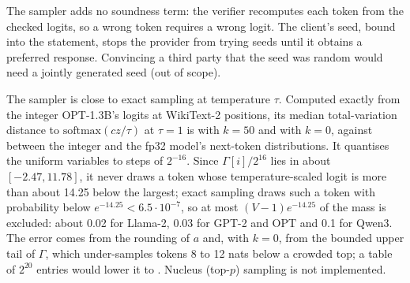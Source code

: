  The sampler adds no soundness term: the verifier recomputes each
token from the checked logits, so a wrong token requires a wrong logit. The client's seed, bound
into the statement, stops the provider from trying seeds until it obtains a preferred response.
Convincing a third party that the seed was random would need a jointly generated seed (out of
scope).

 The sampler is close to exact sampling at temperature $\tau$. Computed exactly
from the integer OPT-1.3B's logits at \TvPositions{} WikiText-2 positions, its median
total-variation distance to $\mathrm{softmax}(cz/\tau)$ at $\tau=1$ is \TvTopK{} with $k=50$ and
\TvFull{} with $k=0$, against \TvModel{} between the integer and the fp32 model's next-token
distributions. It quantises the uniform variables to steps of $2^{-16}$. Since $\Gamma[i]/2^{16}$
lies in about $[-2.47,11.78]$, it never draws a token whose temperature-scaled logit is more than
about 14.25 below the largest; exact sampling draws such a token with probability below
$e^{-14.25}<6.5\cdot10^{-7}$, so at most $(V-1)e^{-14.25}$ of the mass is excluded: about 0.02 for
Llama-2, 0.03 for GPT-2 and OPT and 0.1 for Qwen3. The error comes from the
rounding of $a$ and, with $k=0$, from the bounded upper tail of $\Gamma$, which under-samples tokens
8 to 12 nats below a crowded top; a table of $2^{20}$ entries would lower it to \TvTwenty{}.
Nucleus (top-$p$) sampling is not implemented.
